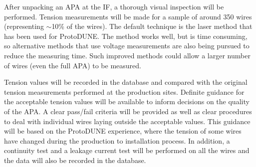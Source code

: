 \begin{comment}
\begin{dunetable}[QC List]{l|c|c}{tab:qclist}{List of tests performed for Quality Control upon reception at the integration facility}   
Test to perform   &  Number of wires/channels & Acceptable values, action\\ 
Visual inspection & All & > 99\% intact \\
Wire tension      & 10$\%$ sample & 5 $\pm$ \SI{1}{N}\\
Wire continuity   & All & $-$\\
Current leakage   & All & < X $\mu$A \\
Electronics connections & All & Perfect (> 99$\%$)\\
Cold test         & All & All intact (> 99$\%$)\\
\textbf{Overall}  & \textbf{All} & \textbf{At least 99$\%$ fully operational}\\
\end{dunetable}
\end{comment}

After unpacking an APA at the IF, a thorough visual inspection will be performed. Tension measurements will be made for a sample of around 350 wires (representing $\sim$10\% of the wires). The default technique is the laser method that has been used for ProtoDUNE.  The method works well, but is time consuming, so alternative methods that use voltage measurements are also being pursued to reduce the measuring time. Such improved methods could allow a larger number of wires (even the full APA) to be measured. 

Tension values will be recorded in the database and compared with the original tension measurements performed at the production sites. Definite guidance for the acceptable tension values will be available to inform decisions on the quality of the APA. A clear pass/fail criteria will be provided as well as clear procedures to deal with individual wires laying outside the acceptable values. %
This guidance will be based on the ProtoDUNE experience, where the tension of some wires have changed during the production to installation process. In addition, a continuity test and a leakage current test will be performed on all the wires and the data will also be recorded in the database. 

